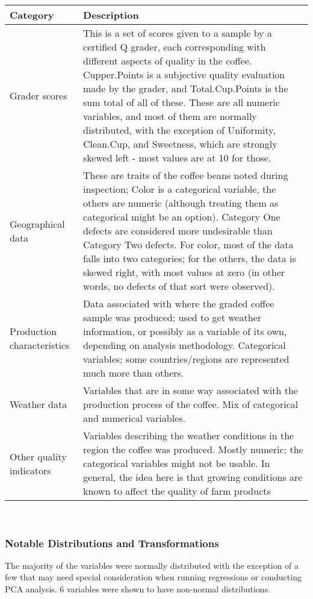\documentclass[
  12pt,
  english,
  man]{apa6}
\begin{document}
\begin{tabular}{>{\raggedright\arraybackslash}p{1in}>{\raggedright\arraybackslash}p{5in}}
\toprule
Category & Description\\
\midrule
Grader scores & This is a set of scores given to a sample by a certified Q grader, each corresponding with different aspects of quality in the coffee. Cupper.Points is a subjective quality evaluation made by the grader, and Total.Cup.Points is the sum total of all of these. These are all numeric variables, and most of them are normally distributed, with the exception of Uniformity, Clean.Cup, and Sweetness, which are strongly skewed left - most values are at 10 for those.\\
Geographical data & These are traits of the coffee beans noted during inspection; Color is a categorical variable, the others are numeric (although treating them as categorical might be an option). Category One defects are considered more undesirable than Category Two defects. For color, most of the data falls into two categories; for the others, the data is skewed right, with most values at zero (in other words, no defects of that sort were observed).\\
Production characteristics & Data associated with where the graded coffee sample was produced; used to get weather information, or possibly as a variable of its own, depending on analysis methodology. Categorical variables; some countries/regions are represented much more than others.\\
Weather data & Variables that are in some way associated with the production process of the coffee. Mix of categorical and numerical variables.\\
Other quality indicators & Variables describing the weather conditions in the region the coffee was produced. Mostly numeric; the categorical variables might not be usable. In general, the idea here is that growing conditions are known to affect the quality of farm products\\
\bottomrule
\end{tabular}

~

\hypertarget{notable-distributions-and-transformations}{%
\subsubsection{Notable Distributions and Transformations}\label{notable-distributions-and-transformations}}

The majority of the variables were normally distributed with the exception of a few that may need special consideration when running regressions or conducting PCA analysis. 6 variables were shown to have non-normal distributions.
\end{document}
